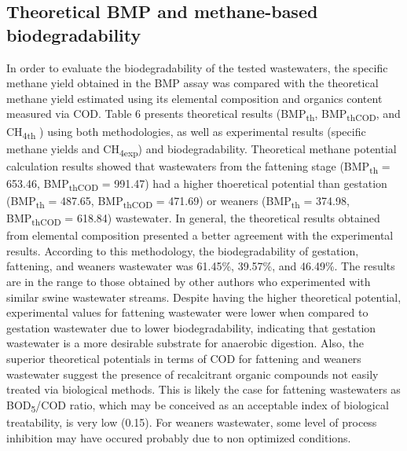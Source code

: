 \subsection{Theoretical BMP and methane-based biodegradability}
In order to evaluate the biodegradability of the tested wastewaters, the specific methane yield obtained in the BMP assay was compared with the theoretical methane yield estimated using its elemental composition and organics content measured via COD. Table 6 presents theoretical results (BMP\textsubscript{th}, BMP\textsubscript{thCOD}, and CH\textsubscript{4th} ) using both methodologies, as well as experimental results (specific methane yields and CH\textsubscript{4exp}) and  biodegradability.  Theoretical methane potential calculation results showed that wastewaters from the fattening stage (BMP\textsubscript{th} = 653.46, BMP\textsubscript{thCOD} = 991.47) had a higher thoeretical potential than gestation (BMP\textsubscript{th} = 487.65, BMP\textsubscript{thCOD} = 471.69) or weaners (BMP\textsubscript{th} = 374.98, BMP\textsubscript{thCOD} = 618.84) wastewater. In general, the theoretical results obtained from elemental composition presented a better agreement with the experimental results. According to this methodology, the biodegradability of gestation, fattening, and weaners wastewater was 61.45\%, 39.57\%, and 46.49\%. The results are in the range to those obtained by other authors \cite{Zhang_2014} who experimented with similar swine wastewater streams. Despite having the higher theoretical potential, experimental values for fattening wastewater were lower when compared to gestation wastewater due to lower biodegradability, indicating that gestation wastewater is a more desirable substrate for anaerobic digestion. Also, the superior theoretical potentials in terms of COD for fattening and weaners wastewater suggest the presence of recalcitrant organic compounds not easily treated via biological methods. This is likely the case for fattening wastewaters as BOD\textsubscript{5}/COD ratio, which may be conceived as an acceptable index of biological treatability, is very low (0.15). For weaners wastewater, some level of process inhibition may have occured probably due to non optimized conditions. 